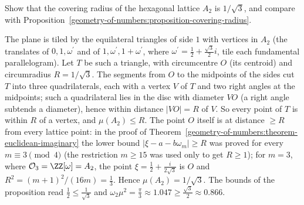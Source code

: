 \begin{exercise}\label{geometry-of-numbers:exercise-covering-a2}
Show that the covering radius of the hexagonal lattice $A_2$ is $1/\sqrt3$, and compare with Proposition~\ref{geometry-of-numbers:proposition-covering-radius}.
\end{exercise}

\begin{solution}
The plane is tiled by the equilateral triangles of side $1$ with vertices in $A_2$ (the translates of $0, 1, \omega^{\prime}$ and of $1, \omega^{\prime}, 1 + \omega^{\prime}$, where $\omega^{\prime} = \frac12 + \frac{\sqrt3}{2}i$, tile
each fundamental parallelogram). Let $T$ be such a triangle, with circumcentre $O$ (its centroid) and circumradius $R = 1/\sqrt3$. The segments from $O$ to the midpoints of the sides cut $T$ into three
quadrilaterals, each with a vertex $V$ of $T$ and two right angles at the midpoints; such a quadrilateral lies in the disc with diameter $VO$ (a right angle subtends a diameter), hence within distance
$|VO| = R$ of $V$. So every point of $T$ is within $R$ of a vertex, and $\mu(A_2) \leq R$. The point $O$ itself is at distance $\geq R$ from every lattice point: in the proof of
Theorem~\ref{geometry-of-numbers:theorem-euclidean-imaginary} the lower bound $|\xi - a - b\omega_m| \geq R$ was proved for every $m \equiv 3 \pmod 4$ (the restriction $m \geq 15$ was used only to get
$R \geq 1$); for $m = 3$, where $\mathcal{O}_3 = \ZZ[\omega] = A_2$, the point $\xi = \frac12 + \frac{i}{2\sqrt3}$ is $O$ and $R^2 = (m + 1)^2/(16m) = \frac13$. Hence $\mu(A_2) = 1/\sqrt3$. The
bounds of the proposition read $\frac12 \leq \frac1{\sqrt3}$ and $\omega_2\mu^2 = \frac{\pi}{3} \approx 1.047 \geq \frac{\sqrt3}{2} \approx 0.866$.
\end{solution}
